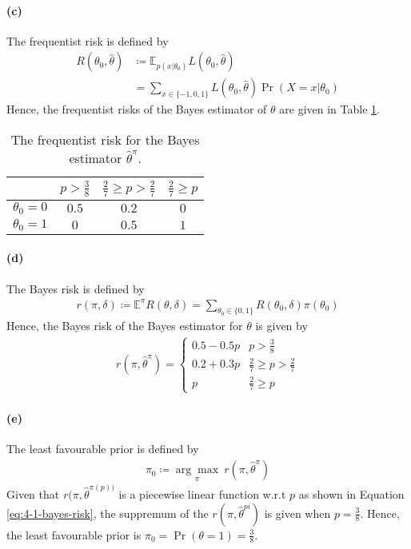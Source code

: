 \paragraph{(c)}
The frequentist risk is defined by 
\begin{align*}
    R(\theta_0, \hat{\theta})
    &\coloneqq \mathbb{E}_{p(x \vert \theta_0)} L(\theta_0, \hat{\theta})\\
    &= \sum_{x\in \{-1, 0, 1\}} L(\theta_0, \hat{\theta}) \Pr(X=x \vert \theta_0)
\end{align*}
Hence, the frequentist risks of the Bayes estimator of $\theta$ are given in Table \ref{tab:4-1-freq-risk}.
\begin{table}[htp]
    \centering
    \begin{tabular}{c c c c}
    \toprule
           & $p > \frac{3}{8}$ & $ \frac{2}{7} \geq p > \frac{2}{7}$ & $\frac{2}{7} \geq p $\\
    \midrule
    $\theta_0=0$ & $0.5$ & $0.2$ & $0$ \\
    $\theta_0=1$ & $0$ & $0.5$ & $1$ \\
    \bottomrule
    \end{tabular}
    \caption{The frequentist risk for the Bayes estimator $\hat{\theta}^\pi$. }
    \label{tab:4-1-freq-risk}
\end{table}

\paragraph{(d)}
The Bayes risk is defined by
\begin{align*}
    r(\pi, \delta) \coloneqq 
    \mathbb{E}^{\pi} R(\theta, \delta) = \sum_{\theta_0 \in \{0, 1\}} R(\theta_0, \delta) \pi(\theta_0)
\end{align*}
Hence, the Bayes risk of the Bayes estimator for $\theta$ is given by
\begin{align}\label{eq:4-1-bayes-risk}
    r(\pi, \hat{\theta}^\pi) =
    \begin{cases}
        0.5 - 0.5p & p>\frac{3}{8}\\
        0.2 + 0.3p & \frac{2}{7} \geq p > \frac{2}{7} \\
        p & \frac{2}{7} \geq p
    \end{cases}
\end{align}

\paragraph{(e)}
The least favourable prior is defined by
\begin{align*}
    \pi_0 \coloneqq \underset{\pi}{\arg\max} \ r(\pi, \hat{\theta}^\pi)
\end{align*}
Given that $r(\pi, \hat{\theta}^{\pi(p))}$ is a piecewise linear function w.r.t $p$ as shown in Equation \ref{eq:4-1-bayes-risk}, the suppremum of the $r(\pi, \hat{\theta}^{pi})$ is given when $p=\frac{3}{8}$. Hence, the least favourable prior is $\pi_0 = \Pr (\theta = 1) = \frac{3}{8}$.
